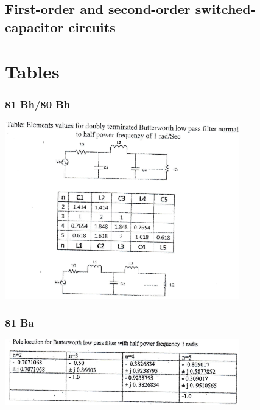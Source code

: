 \documentclass[12pt]{article}
\begin{document}
\subsection{First-order and second-order switched-capacitor circuits}

\pagebreak
\section{Tables}
\label{sec:tables_81bh}
\subsubsection{81 Bh/80 Bh}
\includegraphics[width=4in]{fd_2}
\label{sec:tables_81ba}
\subsubsection{81 Ba}
\includegraphics[width=4in]{fd_3}
\label{sec:tables_80bh}
\end{document}
